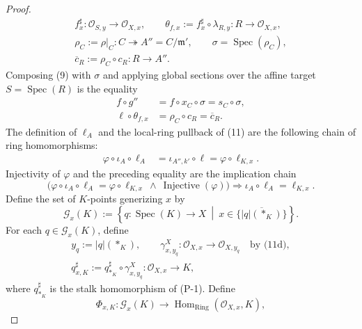\begin{proof}
\[\begin{gathered}
    f_x^\sharp\colon\mathcal O_{S,y}\longrightarrow\mathcal O_{X,x},
    \qquad
    \theta_{f,x}:=f_x^\sharp\circ\lambda_{R,y}
      \colon R\longrightarrow\mathcal O_{X,x},\\
    \rho_C:=\rho|_C\colon C\twoheadrightarrow A''=C/\mathfrak m',
    \qquad
    \sigma=\operatorname{Spec}(\rho_C),\\
    \overline c_R:=\rho_C\circ c_R\colon R\to A''.
  \end{gathered}                                                   \tag{12a}
  \]
  Composing (9) with $\sigma$ and applying global sections over the affine
  target $S=\operatorname{Spec}(R)$ is the equality
  \[
  \begin{aligned}
    f\circ g''
      &=f\circ x_C\circ\sigma
       =s_C\circ\sigma,\\
    \ell\circ\theta_{f,x}
      &=\rho_C\circ c_R=\overline c_R.
  \end{aligned}                                                  \tag{12b}
  \]
  The definition of $\ell_A$ and the local-ring pullback of (11) are the
  following chain of ring homomorphisms:
  \[
  \begin{aligned}
    \varphi\circ\iota_A\circ\ell_A
      &=\iota_{A'',k'}\circ\ell
       =\varphi\circ\ell_{K,x}.
  \end{aligned}
  \]
  Injectivity of $\varphi$ and the preceding equality are the implication
  chain
  \[
    \bigl(
      \varphi\circ\iota_A\circ\ell_A
        =\varphi\circ\ell_{K,x}
      \ \wedge\ \operatorname{Injective}(\varphi)
    \bigr)
      \Longrightarrow
      \iota_A\circ\ell_A=\ell_{K,x}.                           \tag{12c}
  \]
  Define the set of $K$-points generizing $x$ by
  \[
    \mathscr G_x(K):=
      \left\{q\colon\operatorname{Spec}(K)\to X
        \ \middle|\ x\in
          \overline{\{|q|(\ast_K)\}}\right\}.                 \tag{12c0}
  \]
  For each $q\in\mathscr G_x(K)$, define
  \[
  \begin{gathered}
    y_q:=|q|(\ast_K),
    \qquad
    \gamma^X_{x,y_q}\colon\mathcal O_{X,x}\to\mathcal O_{X,y_q}
      \quad\text{by (11d)},\\
    q_{x,K}^\sharp:=q_{\ast_K}^\sharp\circ\gamma^X_{x,y_q}
      \colon\mathcal O_{X,x}\longrightarrow K,
  \end{gathered}                                                   \tag{12c0a}
  \]
  where $q_{\ast_K}^\sharp$ is the stalk homomorphism of (P-1).  Define
  \[
    \Phi_{x,K}\colon\mathscr G_x(K)\longrightarrow
      \operatorname{Hom}_{\mathrm{Ring}}(\mathcal O_{X,x},K),
\]
\end{proof}
